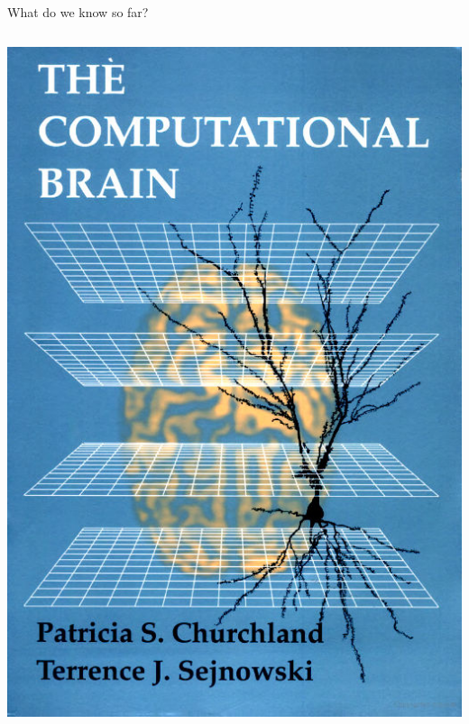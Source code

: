 \documentclass[handout,aspectratio=169]{beamer}
\begin{document}
\begin{frame}{What do we know so far?}
\begin{columns}[T]
		\includegraphics[width=\textwidth]{media/churchland_sejnowski_computational_brain_cover_small.jpg}
	\end{columns}
\end{frame}
\end{document}

